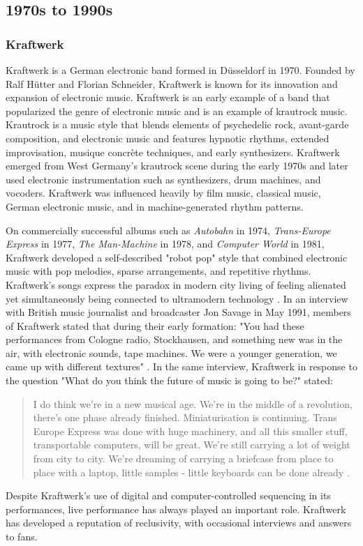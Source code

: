 \documentclass[letterpaper, 12pt]{article}
\begin{document}
\subsection{1970s to 1990s}

\subsubsection{Kraftwerk}


%
Kraftwerk is a German electronic band formed in Düsseldorf in 1970.
%
Founded by Ralf Hütter and Florian Schneider, Kraftwerk is known for its innovation and expansion of electronic music.
%
Kraftwerk is an early example of a band that popularized the genre of electronic music and is an example of krautrock music.
%
Krautrock is a music style that blends elements of psychedelic rock, avant-garde composition, and electronic music and features hypnotic rhythms, extended improvisation, musique concrète techniques, and early synthesizers.
%
Kraftwerk emerged from West Germany's krautrock scene during the early 1970s and later used electronic instrumentation such as synthesizers, drum machines, and vocoders.
%
Kraftwerk was influenced heavily by film music, classical music, German electronic music, and in machine-generated rhythm patterns.

%
On commercially successful albums such as \textit{Autobahn} in 1974, \textit{Trans-Europe Express} in 1977, \textit{The Man-Machine} in 1978, and \textit{Computer World} in 1981, Kraftwerk developed a self-described "robot pop" style that combined electronic music with pop melodies, sparse arrangements, and repetitive rhythms.
%
Kraftwerk's songs express the paradox in modern city living of feeling alienated yet simultaneously being connected to ultramodern technology \citep{barr2013kraftwerk}.
%
In an interview with British music journalist and broadcaster Jon Savage in May 1991, members of Kraftwerk stated that during their early formation: "You had these performances from Cologne radio, Stockhausen, and something new was in the air, with electronic sounds, tape machines. We were a younger generation, we came up with different textures" \citep{savage2012interview}.
%
In the same interview, Kraftwerk in response to the question "What do you think the future of music is going to be?" stated:
\begin{quote}
I do think we’re in a new musical age. We’re in the middle of a revolution, there’s one phase already finished. Miniaturisation is continuing. Trans Europe Express was done with huge machinery, and all this smaller stuff, transportable computers, will be great. We’re still carrying a lot of weight from city to city. We’re dreaming of carrying a briefcase from place to place with a laptop, little samples - little keyboards can be done already \citep{savage2012interview}.
\end{quote}
%
Despite Kraftwerk's use of digital and computer-controlled sequencing in its performances, live performance has always played an important role.
%
Kraftwerk has developed a reputation of reclusivity, with occasional interviews and answers to fans.
\end{document}
